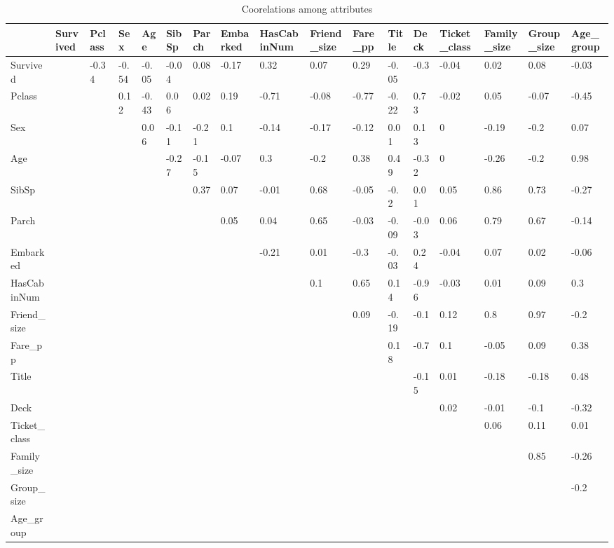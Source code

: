 \documentclass[
]{book}
\begin{document}
\begin{table}

\caption{\label{tab:unnamed-chunk-2}Coorelations among attributes}
\centering
\begin{tabular}[t]{lllllllllllllllll}
\toprule
  & Survived & Pclass & Sex & Age & SibSp & Parch & Embarked & HasCabinNum & Friend\_size & Fare\_pp & Title & Deck & Ticket\_class & Family\_size & Group\_size & Age\_group\\
\midrule
Survived &  & -0.34 & -0.54 & -0.05 & -0.04 & 0.08 & -0.17 & 0.32 & 0.07 & 0.29 & -0.05 & -0.3 & -0.04 & 0.02 & 0.08 & -0.03\\
Pclass &  &  & 0.12 & -0.43 & 0.06 & 0.02 & 0.19 & -0.71 & -0.08 & -0.77 & -0.22 & 0.73 & -0.02 & 0.05 & -0.07 & -0.45\\
Sex &  &  &  & 0.06 & -0.11 & -0.21 & 0.1 & -0.14 & -0.17 & -0.12 & 0.01 & 0.13 & 0 & -0.19 & -0.2 & 0.07\\
Age &  &  &  &  & -0.27 & -0.15 & -0.07 & 0.3 & -0.2 & 0.38 & 0.49 & -0.32 & 0 & -0.26 & -0.2 & 0.98\\
SibSp &  &  &  &  &  & 0.37 & 0.07 & -0.01 & 0.68 & -0.05 & -0.2 & 0.01 & 0.05 & 0.86 & 0.73 & -0.27\\
\addlinespace
Parch &  &  &  &  &  &  & 0.05 & 0.04 & 0.65 & -0.03 & -0.09 & -0.03 & 0.06 & 0.79 & 0.67 & -0.14\\
Embarked &  &  &  &  &  &  &  & -0.21 & 0.01 & -0.3 & -0.03 & 0.24 & -0.04 & 0.07 & 0.02 & -0.06\\
HasCabinNum &  &  &  &  &  &  &  &  & 0.1 & 0.65 & 0.14 & -0.96 & -0.03 & 0.01 & 0.09 & 0.3\\
Friend\_size &  &  &  &  &  &  &  &  &  & 0.09 & -0.19 & -0.1 & 0.12 & 0.8 & 0.97 & -0.2\\
Fare\_pp &  &  &  &  &  &  &  &  &  &  & 0.18 & -0.7 & 0.1 & -0.05 & 0.09 & 0.38\\
\addlinespace
Title &  &  &  &  &  &  &  &  &  &  &  & -0.15 & 0.01 & -0.18 & -0.18 & 0.48\\
Deck &  &  &  &  &  &  &  &  &  &  &  &  & 0.02 & -0.01 & -0.1 & -0.32\\
Ticket\_class &  &  &  &  &  &  &  &  &  &  &  &  &  & 0.06 & 0.11 & 0.01\\
Family\_size &  &  &  &  &  &  &  &  &  &  &  &  &  &  & 0.85 & -0.26\\
Group\_size &  &  &  &  &  &  &  &  &  &  &  &  &  &  &  & -0.2\\
\addlinespace
Age\_group &  &  &  &  &  &  &  &  &  &  &  &  &  &  &  & \\
\bottomrule
\end{tabular}
\end{table}
\end{document}
